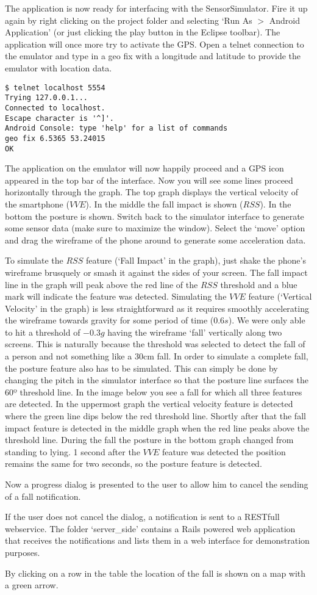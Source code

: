 \documentclass[a4paper, 10pt]{article}
\newcommand{\image}[3][\textwidth]{%
  \begin{figure}[H]%
    \centering%
    \setlength\fboxsep{0pt}\fbox{\texttt{[image: \#2]}}%
    \ifthenelse{\isempty{#3}}%
      {}%
      {\caption{{#3}}}%
    \label{fig:{#2}}%
  \end{figure}
}
\begin{document}
The application is now ready for interfacing with the SensorSimulator. Fire it up again by right clicking on the project folder and selecting `Run As $>$ Android Application' (or just clicking the play button in the Eclipse toolbar). The application will once more try to activate the GPS. Open a telnet connection to the emulator and type in a geo fix with a longitude and latitude to provide the emulator with location data.
\begin{lstlisting}
$ telnet localhost 5554
Trying 127.0.0.1...
Connected to localhost.
Escape character is '^]'.
Android Console: type 'help' for a list of commands
geo fix 6.5365 53.24015
OK
\end{lstlisting}
The application on the emulator will now happily proceed and a GPS icon appeared in the top bar of the interface. Now you will see some lines proceed horizontally through the graph. The top graph displays the vertical velocity of the smartphone ($VVE$). In the middle the fall impact is shown ($RSS$). In the bottom the posture is shown. Switch back to the simulator interface to generate some sensor data (make sure to maximize the window). Select the `move' option and drag the wireframe of the phone around to generate some acceleration data.
\image{simulator.png}{}
To simulate the $RSS$ feature (`Fall Impact' in the graph), just shake the phone's wireframe brusquely or smash it against the sides of your screen. The fall impact line in the graph will peak above the red line of the $RSS$ threshold and a blue mark will indicate the feature was detected. Simulating the $VVE$ feature (`Vertical Velocity' in the graph) is less straightforward as it requires smoothly accelerating the wireframe towards gravity for some period of time ($0.6s$). We were only able to hit a threshold of $-0.3g$ having the wireframe `fall' vertically along two screens. This is naturally because the threshold was selected to detect the fall of a person and not something like a 30cm fall. In order to simulate a complete fall, the posture feature also has to be simulated. This can simply be done by changing the pitch in the simulator interface so that the posture line surfaces the 60º threshold line. 
\newpage
In the image below you see a fall for which all three features are detected. In the uppermost graph the vertical velocity feature is detected where the green line dips below the red threshold line. Shortly after that the fall impact feature is detected in the middle graph when the red line peaks above the threshold line. During the fall the posture in the bottom graph changed from standing to lying. 1 second after the $VVE$ feature was detected the position remains the same for two seconds, so the posture feature is detected.
\image{fall_detected.png}{}
Now a progress dialog is presented to the user to allow him to cancel the sending of a fall notification.
\image{sending_notification.png}{}
\newpage
If the user does not cancel the dialog, a notification is sent to a RESTfull webservice. The folder `server\_side' contains a Rails powered web application that receives the notifications and lists them in a web interface for demonstration purposes. 
\image{server_site.png}{}
By clicking on a row in the table the location of the fall is shown on a map with a green arrow.
\image{map.png}{}
\end{document}
